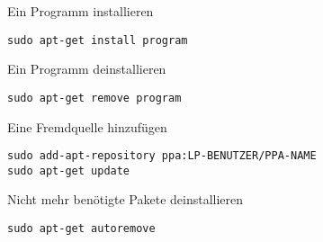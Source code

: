\documentclass[11pt]{article}
\begin{document}
\begin{multicols}{2}
Ein Programm installieren
\begin{lstlisting}
sudo apt-get install program
\end{lstlisting}

Ein Programm deinstallieren
\begin{lstlisting}
sudo apt-get remove program
\end{lstlisting}
\end{multicols}

\begin{multicols}{2}
Eine Fremdquelle hinzufügen
\begin{lstlisting}
sudo add-apt-repository ppa:LP-BENUTZER/PPA-NAME
sudo apt-get update
\end{lstlisting}

\columnbreak

Nicht mehr benötigte Pakete deinstallieren
\begin{lstlisting}
sudo apt-get autoremove
\end{lstlisting}
\end{multicols}


\end{document}
